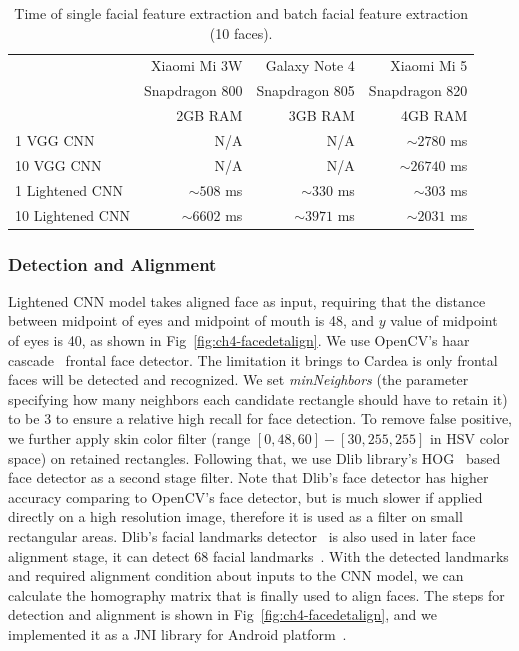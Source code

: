 \begin{table}[!htbp]
\centering
\caption{Time of single facial feature extraction and batch facial feature extraction (10 faces).}
\label{tbl-forwardingtime}
\begin{tabular}{lrrr}
\toprule
 & Xiaomi Mi 3W & Galaxy Note 4 & Xiaomi Mi 5\\
 & {\small Snapdragon 800} & {\small Snapdragon 805} & {\small Snapdragon 820}\\
 & {\small 2GB RAM} & {\small 3GB RAM} & {\small 4GB RAM}\\
 \midrule
1 VGG CNN & N/A & N/A & $\sim 2780$ ms \\
10 VGG CNN & N/A & N/A & $\sim 26740$ ms \\
1 Lightened CNN & $\sim 508$ ms & $\sim 330$ ms & $\sim 303$ ms \\
10 Lightened CNN & $\sim 6602$ ms & $\sim 3971$ ms & $\sim 2031$ ms \\
 \bottomrule

\end{tabular}
\end{table}


\subsubsection{Detection and Alignment}
Lightened CNN model takes aligned face as input, requiring that the distance between midpoint of eyes and midpoint of mouth is 48, and $y$ value of midpoint of eyes is 40, as shown in Fig~\ref{fig:ch4-facedetalign}. We use OpenCV's haar cascade~\cite{links:opencv,viola2001rapid} frontal face detector. The limitation it brings to Cardea is only frontal faces will be detected and recognized. We set \emph{minNeighbors} (the parameter specifying how many neighbors each candidate rectangle should have to retain it) to be 3 to ensure a relative high recall for face detection. To remove false positive, we further apply skin color filter (range $[0, 48, 60] - [30, 255, 255]$ in HSV color space) on retained rectangles. Following that, we use Dlib library's HOG~\cite{links:dlib,dalal2005histograms} based face detector as a second stage filter. Note that Dlib's face detector has higher accuracy comparing to OpenCV's face detector, but is much slower if applied directly on a high resolution image, therefore it is used as a filter on small rectangular areas. Dlib's facial landmarks detector~\cite{links:dlibfacepose} is also used in later face alignment stage, it can detect 68 facial landmarks~\cite{links:dlibfacelandmarkspos, links:dlibfacelandmarkscoords}. With the detected landmarks and required alignment condition about inputs to the CNN model, we can calculate the homography matrix that is finally used to align faces. The steps for detection and alignment is shown in Fig~\ref{fig:ch4-facedetalign}, and we implemented it as a JNI library for Android platform~\cite{links:facealignjni}.

